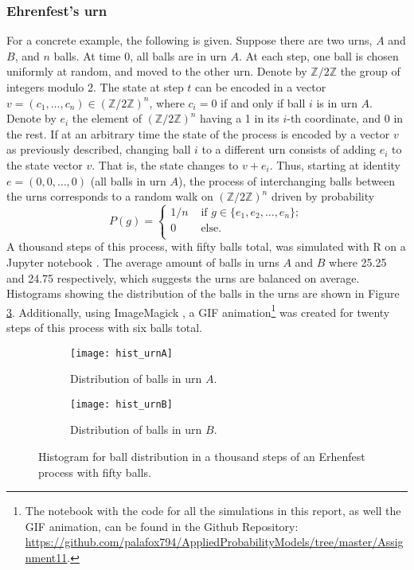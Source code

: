 \documentclass[letterpaper, 10 pt, conference]{article}
\newcommand\Z{\ensuremath{\mathbb{Z}}}
\begin{document}
\subsubsection{Ehrenfest's urn}
For a concrete example, the following is given. Suppose there are two urns, $A$ and $B$, and $n$ balls. At time 0, all balls are in urn $A$. At each step, one ball is chosen uniformly at random, and moved to the other urn. Denote by $\Z/2\Z$ the group of integers modulo 2. The state at step $t$ can be encoded in a vector $v = (c_1, \dots, c_n) \in (\Z / 2 \Z)^n$, where $c_i = 0$ if and only if ball $i$ is in urn $A$. Denote by $e_i$ the element of $ (\Z / 2 \Z)^n $ having a 1 in its $i$-th coordinate, and 0 in the rest. If at an arbitrary time the state of the process is encoded by a vector $v$ as previously described, changing ball $i$ to a different urn consists of adding $e_i$ to the state vector $v$. That is, the state changes to $v + e_i$. Thus, starting at identity $e = (0, 0, \dots, 0)$ (all balls in urn $A$), the process of interchanging balls between the urns corresponds to a random walk on $(\Z / 2 \Z)^n$ driven by probability
\begin{equation}
P(g) = \begin{cases}
1/n & \text{ if } g \in \lbrace e_1, e_2, \dots, e_n\rbrace;\\
0 & \text{ else.}\\
\end{cases}
\end{equation}
%
A thousand steps of this process, with fifty balls total, was simulated with R \citep{R} on a Jupyter notebook \citep{jupyter}. The average amount of balls in urns $A$ and $B$ where 25.25 and 24.75 respectively, which suggests the urns are balanced on average. Histograms showing the distribution of the balls in the urns are shown in Figure \ref{fig:hist_urns}. Additionally, using ImageMagick \citep{imagemagick}, a GIF animation\footnote{The notebook with the code for all the simulations in this report, as well the GIF animation, can be found in the Github Repository: \url{https://github.com/palafox794/AppliedProbabilityModels/tree/master/Assignment11}.}  was created for twenty steps of this process with six balls total.

\begin{figure}
	\centering
	\begin{subfigure}{0.45\linewidth}
		\texttt{[image: hist\_urnA]}
		\caption{Distribution of balls in urn $A$.}
		\label{fig:hist_urnA}
	\end{subfigure}
	\hfill
	\begin{subfigure}{0.45\linewidth}
		\texttt{[image: hist\_urnB]}
		\caption{Distribution of balls in urn $B$.}
		\label{fig:hist_urnB}
	\end{subfigure}
	\caption{Histogram for ball distribution in a thousand steps of an Erhenfest process with fifty balls.} 
	\label{fig:hist_urns}
\end{figure}
\end{document}
